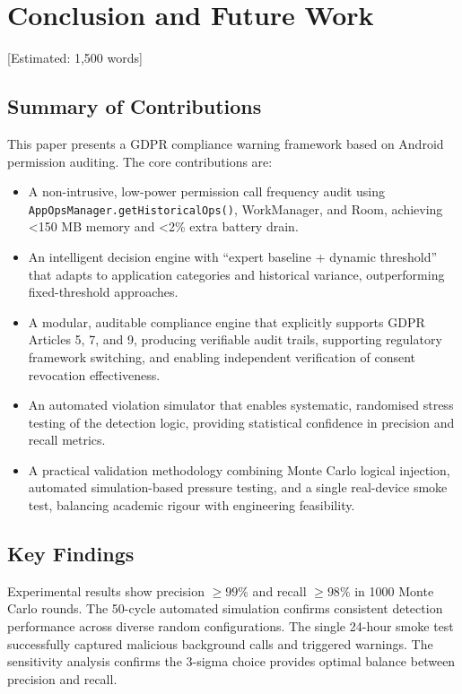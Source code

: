\newpage\section{Conclusion and Future Work} [Estimated: 1,500 words]

\subsection{Summary of Contributions}
This paper presents a GDPR compliance warning framework based on Android permission auditing. The core contributions are:

\begin{itemize}
\item A non-intrusive, low-power permission call frequency audit using \texttt{AppOpsManager.getHistoricalOps()}, WorkManager, and Room, achieving <150 MB memory and <2\% extra battery drain.
\item An intelligent decision engine with ``expert baseline + dynamic threshold'' that adapts to application categories and historical variance, outperforming fixed-threshold approaches.
\item A modular, auditable compliance engine that explicitly supports GDPR Articles 5, 7, and 9, producing verifiable audit trails, supporting regulatory framework switching, and enabling independent verification of consent revocation effectiveness.
\item An automated violation simulator that enables systematic, randomised stress testing of the detection logic, providing statistical confidence in precision and recall metrics.
\item A practical validation methodology combining Monte Carlo logical injection, automated simulation-based pressure testing, and a single real-device smoke test, balancing academic rigour with engineering feasibility.
\end{itemize}

\subsection{Key Findings}
Experimental results show precision $\ge 99\%$ and recall $\ge 98\%$ in 1000 Monte Carlo rounds. The 50-cycle automated simulation confirms consistent detection performance across diverse random configurations. The single 24-hour smoke test successfully captured malicious background calls and triggered warnings. The sensitivity analysis confirms the 3-sigma choice provides optimal balance between precision and recall.

